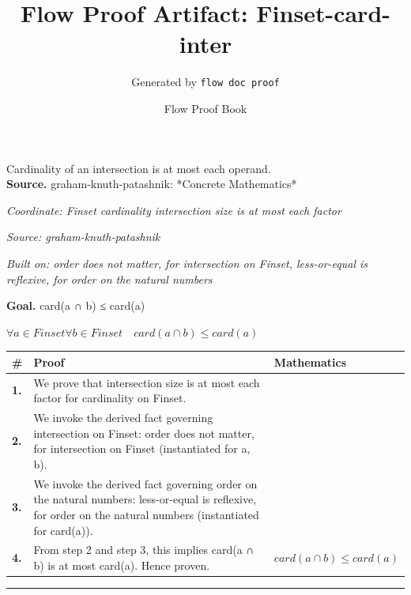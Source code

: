 \documentclass[11pt]{article}
\title{Flow Proof Artifact: Finset-card-inter}
\author{Generated by \texttt{flow doc proof}}
\date{Flow Proof Book}
\theoremstyle{definition}
\begin{document}
\maketitle
Cardinality of an intersection is at most each operand.\\[0.5em]
\textbf{Source.} graham-knuth-patashnik: *Concrete Mathematics*\\[0.5em]
\bigskip
{}\par
\smallskip\noindent\textit{Coordinate: Finset \cdot cardinality \cdot intersection size is at most each factor}\par
\smallskip\noindent\textit{Source: graham-knuth-patashnik}\par
\smallskip\noindent\textit{Built on: order does not matter, for intersection on Finset, less-or-equal is reflexive, for order on the natural numbers}\par
\medskip
\noindent\textbf{Goal.} card(a ∩ b) ≤ card(a)\par
\noindent$\displaystyle \forall a \in Finset \forall b \in Finset\quad card(a ∩ b) \le card(a)$\par
\medskip
\noindent
\begin{tabular}{@{} >{\raggedright\arraybackslash}p{} >{\raggedright\arraybackslash}p{} >{\raggedleft\arraybackslash}p{} @{}}
\textbf{\#} & \textbf{Proof} & \textbf{Mathematics} \\
\midrule
\textbf{1.} & We prove that intersection size is at most each factor for cardinality on Finset. & \\[0.45em]
\textbf{2.} & We invoke the derived fact governing intersection on Finset: order does not matter, for intersection on Finset (instantiated for a, b). & \\[0.45em]
\textbf{3.} & We invoke the derived fact governing order on the natural numbers: less-or-equal is reflexive, for order on the natural numbers (instantiated for card(a)). & \\[0.45em]
\textbf{4.} & From step 2 and step 3, this implies card(a ∩ b) is at most card(a). Hence proven. & $\displaystyle card(a ∩ b) \le card(a)$ \\[0.45em]
\bottomrule
\end{tabular}
\label{thm:Finset-cardinality-intersection_size_is_at_most_each_factor}
\par\medskip\hrule
\end{document}
